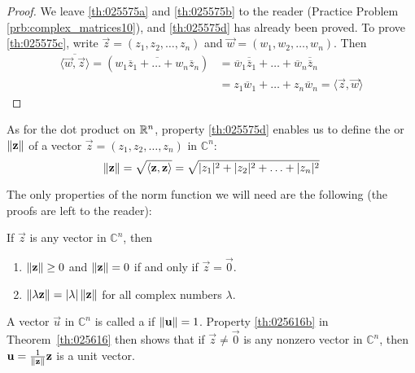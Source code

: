 \documentclass{ximera}
\begin{document}
\begin{proof}
We leave \ref{th:025575a} and \ref{th:025575b} to the reader (Practice Problem \ref{prb:complex_matrices10}), and \ref{th:025575d} has already been proved. To prove \ref{th:025575c}, write $\vec{z} = (z_{1}, z_{2}, \ldots, z_{n})$ and $\vec{w} = (w_{1}, w_{2}, \ldots, w_{n})$. Then
\begin{align*}
\overline{\langle \vec{w}, \vec{z} \rangle} = (\overline{w_{1}\overline{z}_{1} + \ldots + w_{n}\overline{z}_{n}}) &= \overline{w}_{1}\overline{\overline{z}}_{1} + \ldots + \overline{w}_{n}\overline{\overline{z}}_{n} \\
&= z_{1}\overline{w}_{1} + \ldots + z_{n}\overline{w}_{n} = \langle \vec{z}, \vec{w} \rangle
\end{align*}
\end{proof}

\begin{definition}\label{def:025606}
As for the dot product on $\mathbb{R}^n$, property \ref{th:025575d} enables us to define the  or  $\left\lVert\mathbf{z}\right\rVert$ of a vector $\vec{z} = (z_{1}, z_{2}, \ldots, z_{n})$ in $\mathbb{C}^n$:
\begin{equation*}
\left\lVert\mathbf{z}\right\rVert = \sqrt{\langle \mathbf{z}, \mathbf{z} \rangle} = \sqrt{|z_{1}|^2 + |z_{2}|^2 + \ldots + |z_{n}|^2}
\end{equation*}
\end{definition}

The only properties of the norm function we will need are the following (the proofs are left to the reader):


\begin{theorem}\label{th:025616}
If $\vec{z}$ is any vector in $\mathbb{C}^n$, then


\begin{enumerate}
\item\label{th:025616a} $\left\lVert\mathbf{z}\right\rVert \ge 0$ and $\left\lVert\mathbf{z}\right\rVert = 0$ if and only if $\vec{z} = \vec{0}$.

\item\label{th:025616b} $\left\lVert\lambda\mathbf{z}\right\rVert = |\lambda| \left\lVert\mathbf{z}\right\rVert$ for all complex numbers $\lambda$.

\end{enumerate}
\end{theorem}

A vector $\vec{u}$ in $\mathbb{C}^n$ is called a  if $\left\lVert\mathbf{u}\right\rVert = 1$. Property \ref{th:025616b} in Theorem~\ref{th:025616} then shows that if $\vec{z} \neq \vec{0}$ is any nonzero vector in $\mathbb{C}^n$, then $\mathbf{u} = \frac{1}{\left\lVert\mathbf{z}\right\rVert}\mathbf{z}$ is a unit vector.
\end{document}
